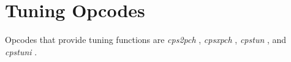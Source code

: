\begin{comment}
\documentclass[10pt]{article}
\usepackage{fullpage, graphicx, url}
\setlength{\parskip}{1ex}
\setlength{\parindent}{0ex}
\title{Tuning Opcodes}



\begin{tabular}{ccc}
The Alternative Csound Reference Manual & & \\
Previous &Pitch Converters &Next

\end{tabular}

\end{comment}
\section{Tuning Opcodes}


  Opcodes that provide tuning functions are \emph{cps2pch}
, \emph{cpsxpch}
, \emph{cpstun}
, and \emph{cpstuni}
. 


\begin{comment}
\begin{tabular}{lcr}
Previous &Home &Next \\
Pitch Converters &Up &Signal Generators

\end{tabular}



\end{comment}
